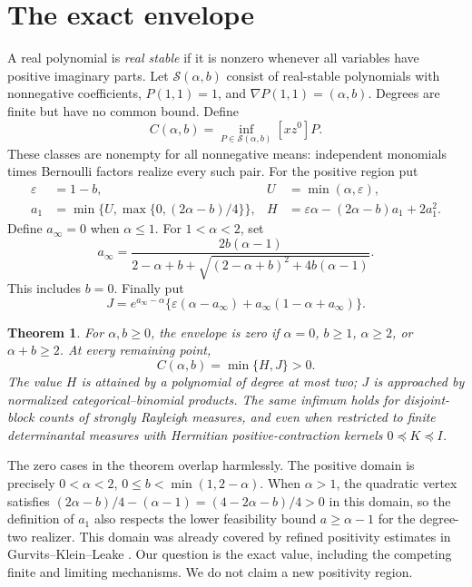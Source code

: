 \documentclass[11pt]{article}
\newtheorem{theorem}{Theorem}
\newcommand{\eps}{\varepsilon}
\begin{document}
\section{The exact envelope}
A real polynomial is \emph{real stable} if it is nonzero whenever all
variables have positive imaginary parts. Let $\mathcal S(\alpha,b)$
consist of real-stable polynomials with nonnegative coefficients,
$P(1,1)=1$, and $\nabla P(1,1)=(\alpha,b)$. Degrees are finite but have
no common bound. Define
\[
 C(\alpha,b)=\inf_{P\in\mathcal S(\alpha,b)}[xz^0]P.
\]
These classes are nonempty for all nonnegative means: independent
monomials times Bernoulli factors realize every such pair.
For the positive region put
\begin{align}
 \eps&=1-b,& U&=\min(\alpha,\eps),\\
 a_1&=\min\{U,\max\{0,(2\alpha-b)/4\}\},&
 H&=\eps\alpha-(2\alpha-b)a_1+2a_1^2.\label{eq:H}
\end{align}
Define $a_\infty=0$ when $\alpha\le1$. For $1<\alpha<2$, set
\begin{equation}\label{eq:ainfty}
 a_\infty=\frac{2b(\alpha-1)}{2-\alpha+b+
 \sqrt{(2-\alpha+b)^2+4b(\alpha-1)}}.
\end{equation}
This includes $b=0$. Finally put
\begin{equation}\label{eq:J}
 J=e^{a_\infty-\alpha}
 \{\eps(\alpha-a_\infty)+a_\infty(1-\alpha+a_\infty)\}.
\end{equation}
\begin{theorem}\label{thm:main}
For $\alpha,b\ge0$, the envelope is zero if $\alpha=0$, $b\ge1$,
$\alpha\ge2$, or $\alpha+b\ge2$. At every remaining point,
\begin{equation}\label{eq:main}
 C(\alpha,b)=\min\{H,J\}>0.
\end{equation}
The value $H$ is attained by a polynomial of degree at most two; $J$ is
approached by normalized categorical--binomial products. The same
infimum holds for disjoint-block counts of strongly Rayleigh measures,
and even when restricted to finite determinantal measures with Hermitian
positive-contraction kernels $0\preceq K\preceq I$.
\end{theorem}
The zero cases in the theorem overlap harmlessly. The positive domain
is precisely $0<\alpha<2$, $0\le b<\min(1,2-\alpha)$.
When $\alpha>1$, the quadratic vertex satisfies
$(2\alpha-b)/4-(\alpha-1)=(4-2\alpha-b)/4>0$ in this domain,
so the definition of $a_1$ also respects the lower feasibility bound
$a\ge\alpha-1$ for the degree-two realizer.
This domain was already covered by refined positivity estimates in
Gurvits--Klein--Leake \cite[Theorem 5.11 and Corollary 5.13]{GKL}.
Our question is the exact value, including the competing finite and
limiting mechanisms. We do not claim a new positivity region.
\end{document}
